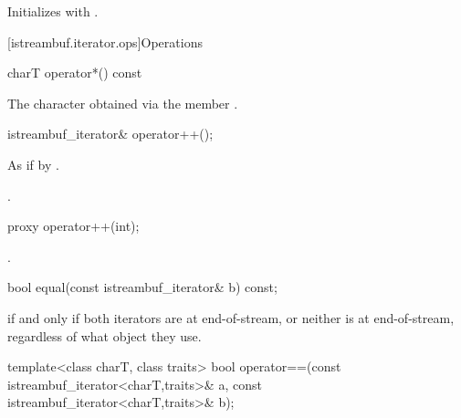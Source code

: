 \begin{itemdescr}
\pnum
\effects
Initializes  with .
\end{itemdescr}

[istreambuf.iterator.ops]{Operations}

%
\begin{itemdecl}
charT operator*() const
\end{itemdecl}

\begin{itemdescr}
\pnum
\returns
The character obtained via the
member
.
\end{itemdescr}

%
\begin{itemdecl}
istreambuf_iterator& operator++();
\end{itemdecl}

\begin{itemdescr}
\pnum
\effects
As if by .

\pnum
\returns
{}.
\end{itemdescr}

%
\begin{itemdecl}
proxy operator++(int);
\end{itemdecl}

\begin{itemdescr}
\pnum
\returns
{}.
\end{itemdescr}

%
\begin{itemdecl}
bool equal(const istreambuf_iterator& b) const;
\end{itemdecl}

\begin{itemdescr}
\pnum
\returns
{}
if and only if both iterators are at end-of-stream,
or neither is at end-of-stream, regardless of what
object they use.
\end{itemdescr}

%
\begin{itemdecl}
template<class charT, class traits>
  bool operator==(const istreambuf_iterator<charT,traits>& a,
                  const istreambuf_iterator<charT,traits>& b);
\end{itemdecl}

